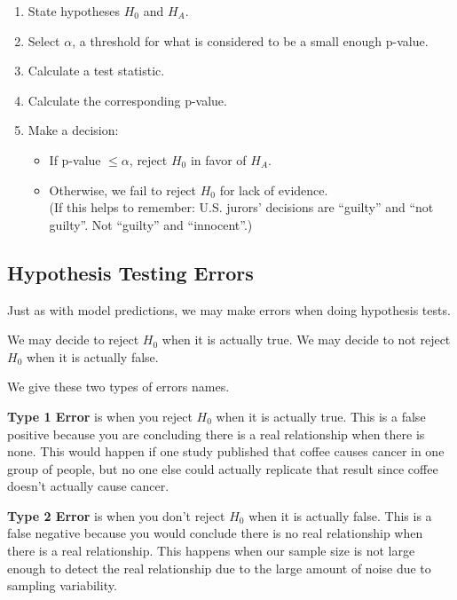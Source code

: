 \documentclass[
]{book}
\providecommand{\tightlist}{%
  \setlength{\itemsep}{0pt}\setlength{\parskip}{0pt}}
\begin{document}
\begin{enumerate}
\def\labelenumi{\arabic{enumi}.}
\tightlist
\item
  State hypotheses \(H_0\) and \(H_A\).
\item
  Select \(\alpha\), a threshold for what is considered to be a small enough p-value.
\item
  Calculate a test statistic.
\item
  Calculate the corresponding p-value.
\item
  Make a decision:

  \begin{itemize}
  \tightlist
  \item
    If p-value \(\leq\alpha\), reject \(H_0\) in favor of \(H_A\).
  \item
    Otherwise, we fail to reject \(H_0\) for lack of evidence.\\
    (If this helps to remember: U.S. jurors' decisions are ``guilty'' and ``not guilty''. Not ``guilty'' and ``innocent''.)
  \end{itemize}
\end{enumerate}

\subsection{Hypothesis Testing Errors}\label{hypothesis-testing-errors}

Just as with model predictions, we may make errors when doing hypothesis tests.

We may decide to reject \(H_0\) when it is actually true. We may decide to not reject \(H_0\) when it is actually false.

We give these two types of errors names.

\textbf{Type 1 Error} is when you reject \(H_0\) when it is actually true. This is a false positive because you are concluding there is a real relationship when there is none. This would happen if one study published that coffee causes cancer in one group of people, but no one else could actually replicate that result since coffee doesn't actually cause cancer.

\textbf{Type 2 Error} is when you don't reject \(H_0\) when it is actually false. This is a false negative because you would conclude there is no real relationship when there is a real relationship. This happens when our sample size is not large enough to detect the real relationship due to the large amount of noise due to sampling variability.
\end{document}
